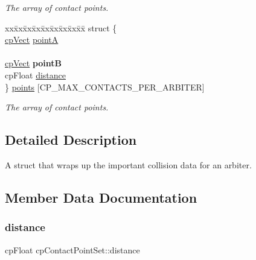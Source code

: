 \begin{DoxyCompactItemize}
\begin{tabbing}
\end{tabbing}\begin{DoxyCompactList}\small\item\em The array of contact points. \end{DoxyCompactList}\item 
\mbox{\label{structcpContactPointSet_a0af11a619f8e6170cfd4884c55605aff}} 
\begin{tabbing}
xx\=xx\=xx\=xx\=xx\=xx\=xx\=xx\=xx\=\kill
struct \{\\
\>\hyperlink{structcpVect}{cpVect} \hyperlink{structcpContactPointSet_a9d7ac05d747afa63699e89ea6dba62c2}{pointA}\\
\>\\
\>\hyperlink{structcpVect}{cpVect} {\bfseries pointB}\\
\>cpFloat \hyperlink{structcpContactPointSet_ad8581bff488e9f44ef899f75e044bc6c}{distance}\\
\} \hyperlink{structcpContactPointSet_a0af11a619f8e6170cfd4884c55605aff}{points} \mbox{[}CP\_MAX\_CONTACTS\_PER\_ARBITER\mbox{]}\\

\end{tabbing}\begin{DoxyCompactList}\small\item\em The array of contact points. \end{DoxyCompactList}\end{DoxyCompactItemize}


\subsection{Detailed Description}
A struct that wraps up the important collision data for an arbiter. 

\subsection{Member Data Documentation}
\mbox{\label{structcpContactPointSet_ad8581bff488e9f44ef899f75e044bc6c}} 
\subsubsection{\texorpdfstring{distance}{distance}}
{\footnotesize\ttfamily cp\+Float cp\+Contact\+Point\+Set\+::distance}

